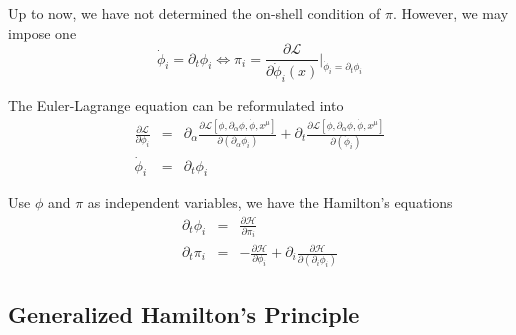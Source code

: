 \documentclass[12pt]{book}
\begin{document}
	Up to now, we have not determined the on-shell condition of $\pi$. However, we may impose one
	\begin{equation}
		\dot\phi_i=\partial_t\phi_i\Leftrightarrow \pi_i=\frac{\partial\mathcal{L}}{\partial\dot\phi_i(x)}\Bigg|_{\dot\phi_i=\partial_t\phi_i}
	\end{equation}
	
	The Euler-Lagrange equation can be reformulated into
	\begin{eqnarray}
		\frac{\partial\mathcal{L}}{\partial\phi_i}&=&\partial_\alpha\frac{\partial\mathcal L[\phi,\partial_\alpha\phi,\dot\phi,x^\mu]}{\partial(\partial_\alpha\phi_i)}+\partial_t\frac{\partial\mathcal L[\phi,\partial_\alpha\phi,\dot\phi,x^\mu]}{\partial(\dot\phi_i)}\\
		\dot\phi_i&=&\partial_t\phi_i
	\end{eqnarray}
	
	Use $\phi$ and $\pi$ as independent variables, we have the Hamilton's equations
	\begin{eqnarray}
		\partial_t\phi_i&=&\frac{\partial\mathcal{H}}{\partial\pi_i}\\
		\partial_t\pi_i&=&-\frac{\partial\mathcal{H}}{\partial\phi_i}+\partial_i\frac{\partial\mathcal{H}}{\partial(\partial_i\phi_i)}
	\end{eqnarray}
	
	\subsection{Generalized Hamilton's Principle}
\end{document}
